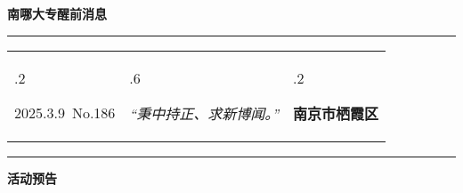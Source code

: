 \documentclass[letterpaper, 12pt]{article}
\begin{document}
\begin{center}
    \Huge\textbf{南哪大专醒前消息}
\end{center}
\vspace{4mm}
\hrule
\renewcommand\tabularxcolumn[1]{m{#1}}
\begin{tabularx}{\textwidth}{>{\hsize.2\hsize}X>{\hsize.6\hsize}X>{\hsize.2\hsize}X}
    \begin{flushleft}
        2025.3.9\, No.186
    \end{flushleft}
    &
    \begin{center}
        \textit{“秉中持正、求新博闻。”}
    \end{center}
    &
    \begin{flushright}
        \textbf{南京市栖霞区}
    \end{flushright}
\end{tabularx}
\vspace{-3.5mm}
\hrule
\vspace{4mm}
\centerline{\huge\textbf{活动预告}}
\end{document}
